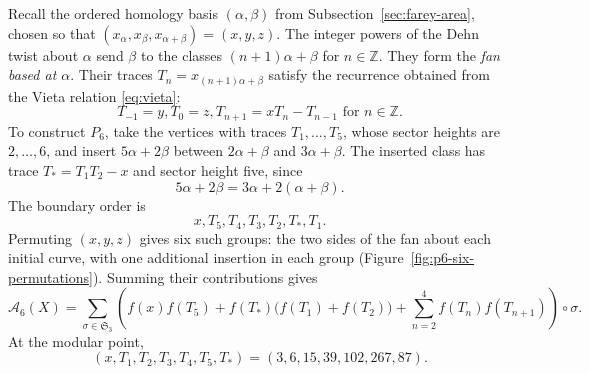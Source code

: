 \documentclass[10pt,twoside]{article}
\theoremstyle{plain}
\theoremstyle{definition}
\theoremstyle{remark}
\newcommand{\A}{\mathcal A}
\newcommand{\Z}{\mathbb Z}
\begin{document}
Recall the ordered homology basis $(\alpha,\beta)$ from
Subsection~\ref{sec:farey-area}, chosen so that
$(x_\alpha,x_\beta,x_{\alpha+\beta})=(x,y,z)$.
The integer powers of the Dehn twist about $\alpha$ send
$\beta$ to the classes $(n+1)\alpha+\beta$ for $n\in\Z$.
They form the \emph{fan based at $\alpha$}. Their traces
$T_n=x_{(n+1)\alpha+\beta}$ satisfy the recurrence obtained
from the Vieta relation \eqref{eq:vieta}:
\begin{equation}
\label{eq:sector-trace-recursion}
T_{-1}=y,
T_0=z,
T_{n+1}=xT_n-T_{n-1}
\text{ for }n\in\Z.
\end{equation}
To construct $P_6$, take the vertices with traces
$T_1,\ldots,T_5$, whose sector heights are $2,\ldots,6$,
and insert $5\alpha+2\beta$ between $2\alpha+\beta$ and
$3\alpha+\beta$. The inserted class has trace $T_*=T_1T_2-x$
and sector height five, since
$$
5\alpha+2\beta=3\alpha+2(\alpha+\beta).
$$
The boundary order is
$$
x,T_5,T_4,T_3,T_2,T_*,T_1.
$$
Permuting $(x,y,z)$ gives six such groups: the two sides of the
fan about each initial curve, with one additional insertion in
each group (Figure~\ref{fig:p6-six-permutations}). Summing their
contributions gives
\begin{equation}
\label{eq:height-six-polygon-area}
\A_6(X)
=\sum_{\sigma\in\mathfrak S_3}
\left(
f(x)f(T_5)+f(T_*)\bigl(f(T_1)+f(T_2)\bigr)
+\sum_{n=2}^{4}f(T_n)f(T_{n+1})
\right)\circ\sigma.
\end{equation}
At the modular point,
$$
(x,T_1,T_2,T_3,T_4,T_5,T_*)=(3,6,15,39,102,267,87).
$$
\end{document}
